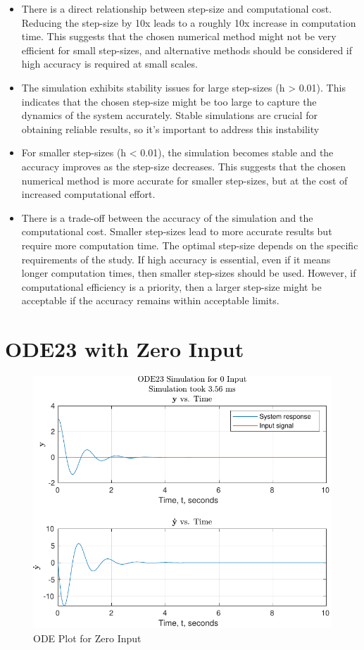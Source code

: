\documentclass[12pt]{article}
\begin{document}
		\begin{itemize}
			\item There is a direct relationship between step-size and computational cost. Reducing the step-size by 10x leads to a roughly 10x increase in computation time. This suggests that the chosen numerical method might not be very efficient for small step-sizes, and alternative methods should be considered if high accuracy is required at small scales.
			\item The simulation exhibits stability issues for large step-sizes (h > 0.01). This indicates that the chosen step-size might be too large to capture the dynamics of the system accurately. Stable simulations are crucial for obtaining reliable results, so it's important to address this instability
			\item For smaller step-sizes (h < 0.01), the simulation becomes stable and the accuracy improves as the step-size decreases. This suggests that the chosen numerical method is more accurate for smaller step-sizes, but at the cost of increased computational effort.
			\item There is a trade-off between the accuracy of the simulation and the computational cost. Smaller step-sizes lead to more accurate results but require more computation time. The optimal step-size depends on the specific requirements of the study. If high accuracy is essential, even if it means longer computation times, then smaller step-sizes should be used. However, if computational efficiency is a priority, then a larger step-size might be acceptable if the accuracy remains within acceptable limits.
		\end{itemize}
	\section{ODE23 with Zero Input}
	
		\begin{figure}[H]
			\centering
			\includegraphics[width=1\linewidth]{Code/Fig/ode_no_input}
			\caption{ODE Plot for Zero Input}
			\label{fig:odenoinput}
		\end{figure}
		
\end{document}
